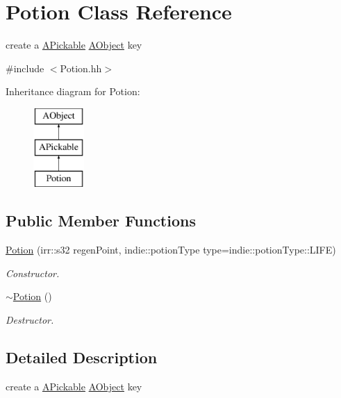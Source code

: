 \hypertarget{classPotion}{}\section{Potion Class Reference}
\label{classPotion}


create a \hyperlink{classAPickable}{A\+Pickable} \hyperlink{classAObject}{A\+Object} key  




{\ttfamily \#include $<$Potion.\+hh$>$}

Inheritance diagram for Potion\+:\begin{figure}[H]
\begin{center}
\leavevmode
\includegraphics[height=3.000000cm]{classPotion}
\end{center}
\end{figure}
\subsection*{Public Member Functions}
\begin{DoxyCompactItemize}
\item 
\hyperlink{classPotion_a54db73677923273e469abf581ce0515c}{Potion} (irr\+::s32 regen\+Point, indie\+::potion\+Type type=indie\+::potion\+Type\+::\+L\+I\+FE)
\begin{DoxyCompactList}\small\item\em Constructor. \end{DoxyCompactList}\item 
\hyperlink{classPotion_a8730c8052ec698171885bb5dacda9cca}{$\sim$\+Potion} ()
\begin{DoxyCompactList}\small\item\em Destructor. \end{DoxyCompactList}\end{DoxyCompactItemize}


\subsection{Detailed Description}
create a \hyperlink{classAPickable}{A\+Pickable} \hyperlink{classAObject}{A\+Object} key 


